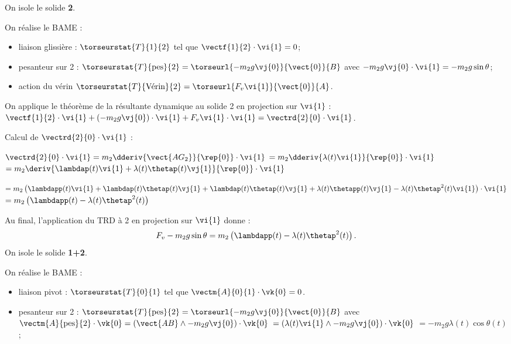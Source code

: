 \begin{corrigebox}
On isole le solide \textbf{2}.

On réalise le BAME : 
\begin{itemize}
\item liaison glissière : $\torseurstat{T}{1}{2}$ tel que $\vectf{1}{2}\cdot\vi{1} = 0$;
\item pesanteur sur 2 : $\torseurstat{T}{\text{pes}}{2} = \torseurl{-m_2 g \vj{0}}{\vect{0}}{B}$ avec $-m_2 g \vj{0} \cdot \vi{1} = -m_2 g\sin \theta$;
\item action du vérin $\torseurstat{T}{\text{Vérin}}{2} =  \torseurl{F_v \vi{1}}{\vect{0}}{A}$.
\end{itemize}

On applique le théorème de la résultante dynamique au solide 2 en projection sur $\vi{1}$ :
$\vectf{1}{2}\cdot\vi{1} + \left(-m_2 g \vj{0}\right) \cdot \vi{1} + F_v \vi{1}\cdot \vi{1} = \vectrd{2}{0}\cdot \vi{1}$.

Calcul de $\vectrd{2}{0}\cdot \vi{1}$ : 

$\vectrd{2}{0}\cdot \vi{1} = m_2\dderiv{\vect{AG_2}}{\rep{0}} \cdot \vi{1}$
$= m_2 \dderiv{\lambda(t) \vi{1} }{\rep{0}} \cdot \vi{1}$
$= m_2 \deriv{\lambdap(t) \vi{1} + \lambda(t) \thetap(t)\vj{1} }{\rep{0}} \cdot \vi{1}$

$= m_2 \left(\lambdapp(t) \vi{1} + \lambdap(t) \thetap(t)\vj{1} + \lambdap(t) \thetap(t)\vj{1}
+ \lambda(t) \thetapp(t)\vj{1}- \lambda(t) \thetap^2(t)\vi{1} \right) \cdot \vi{1}$
$= m_2 \left(\lambdapp(t)   - \lambda(t) \thetap^2(t) \right)$

Au final, l'application du TRD à 2 en projection sur $\vi{1}$ donne : 
$$ F_v-m_2 g\sin \theta = m_2 \left(\lambdapp(t)   - \lambda(t) \thetap^2(t) \right).$$
On isole le solide \textbf{1+2}.

On réalise le BAME : 
\begin{itemize}
\item liaison pivot : $\torseurstat{T}{0}{1}$ tel que $\vectm{A}{0}{1}\cdot\vk{0} = 0$.
\item pesanteur sur 2 : $\torseurstat{T}{\text{pes}}{2} = \torseurl{-m_2 g \vj{0}}{\vect{0}}{B}$ avec 
$\vectm{A}{\text{pes}}{2} \cdot \vk{0} = \left(\vect{AB}\wedge -m_2 g \vj{0} \right)\cdot \vk{0}$
$= \left(\lambda(t) \vi{1} \wedge -m_2 g \vj{0} \right)\cdot \vk{0}$
$= -m_2 g\lambda(t)\cos\theta(t) $;


\end{itemize}
\end{corrigebox}
